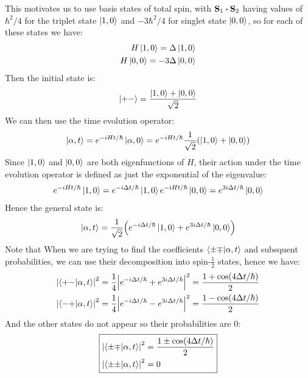 \documentclass[12pt]{article}
\begin{document}
This motivates us to use basis states of total spin, with $\vb{S}_1\vdot\vb{S}_2$ having values of $\hbar^2/4$ for the triplet state $\ket{1,0}$ and $-3\hbar^2/4$ for singlet state $\ket{0,0}$, so for each of these states we have:
\begin{align*}
  H\ket{1,0}=\Delta\ket{1,0}\\
  H\ket{0,0}=-3\Delta\ket{0,0}
\end{align*}
Then the initial state is:
\begin{align*}
  \ket{+-}=\frac{\ket{1,0}+\ket{0,0}}{\sqrt{2}}
\end{align*}
We can then use the time evolution operator:
\begin{align*}
  \ket{\alpha,t}=e^{-iHt/\hbar}\ket{\alpha,0}
  =e^{-iHt/\hbar}\frac{1}{\sqrt{2}}\qty(\ket{1,0}+\ket{0,0})
\end{align*}
Since $\ket{1,0}$ and $\ket{0,0}$ are both eigenfunctions of $H$, their action under the time evolution operator is defined as just the exponential of the eigenvalue:
\begin{align*}
  e^{-iHt/\hbar}\ket{1,0}=e^{-i\Delta t/\hbar}\ket{1,0}
  e^{-iHt/\hbar}\ket{0,0}=e^{3i\Delta t/\hbar}\ket{0,0}
\end{align*}
Hence the general state is:
\begin{align*}
  \ket{\alpha,t}
  =\frac{1}{\sqrt{2}}\qty(e^{-i\Delta t/\hbar}\ket{1,0}+e^{3i\Delta t/\hbar}\ket{0,0})
\end{align*}
Note that When we are trying to find the coefficients $\ip{\pm\mp}{\alpha,t}$ and subsquent probabilities, we can use their decomposition into spin-$\frac12$ states, hence we have:
\begin{align*}
  \abs{\ip{+-}{\alpha,t}}^2&=\frac14
  \abs{e^{-i\Delta t/\hbar}+e^{3i\Delta t/\hbar}}^2
  =\frac{1+\cos(4\Delta t/\hbar)}2\\
  \abs{\ip{-+}{\alpha,t}}^2&=\frac14
  \abs{e^{-i\Delta t/\hbar}-e^{3i\Delta t/\hbar}}^2
  =\frac{1-\cos(4\Delta t/\hbar)}2
\end{align*}
And the other states do not appear so their probabilities are 0:
\begin{equation}
  \boxed{\begin{aligned}
    \abs{\ip{\pm\mp}{\alpha,t}}^2&=\frac{1\pm\cos(4\Delta t/\hbar)}2\\
    \abs{\ip{\pm\pm}{\alpha,t}}^2&=0
  \end{aligned}}
\end{equation}
\end{document}
